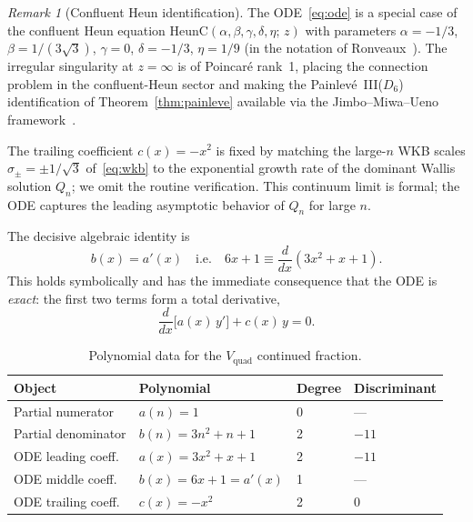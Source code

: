 \documentclass[11pt,a4paper]{article}
\theoremstyle{definition}
\theoremstyle{remark}
\newtheorem{remark}[theorem]{Remark}
\newcommand{\Vq}{V_{\mathrm{quad}}}
\begin{document}
\begin{remark}[Confluent Heun identification]
\label{rem:heunc}
The ODE~\eqref{eq:ode} is a special case of the confluent Heun
equation $\mathrm{HeunC}(\alpha,\beta,\gamma,\delta,\eta;\,z)$
with parameters $\alpha = -1/3$, $\beta = 1/(3\sqrt{3})$,
$\gamma = 0$, $\delta = -1/3$, $\eta = 1/9$
(in the notation of Ronveaux~\cite{ronveaux1995}).
The irregular singularity at $z=\infty$ is of Poincar\'e rank~1,
placing the connection problem in the confluent-Heun sector
and making the Painlev\'e~III($D_6$) identification of
Theorem~\ref{thm:painleve} available via the Jimbo--Miwa--Ueno
framework~\cite{jimbo1981}.
\end{remark}

The trailing coefficient $c(x)=-x^2$ is fixed by
matching the large-$n$ WKB scales
$\sigma_\pm = \pm 1/\sqrt{3}$ of~\eqref{eq:wkb}
to the exponential growth rate of the dominant Wallis
solution $Q_n$; we omit the routine verification.
This continuum limit is formal; the ODE captures the
leading asymptotic behavior of $Q_n$ for large $n$.

The decisive algebraic identity is
\begin{equation}\label{eq:exact-identity}
  b(x) = a'(x)
  \quad\text{i.e.}\quad
  6x+1 \equiv \frac{d}{dx}(3x^2+x+1).
\end{equation}
This holds symbolically and has the immediate
consequence that the ODE is \emph{exact}: the
first two terms form a total derivative,
\begin{equation}\label{eq:exact-ode}
  \frac{d}{dx}\bigl[a(x)\,y'\bigr]
  + c(x)\,y = 0.
\end{equation}

\begin{table}[ht]
\centering
\caption{Polynomial data for the
$\Vq$ continued fraction.}
\label{tab:poly}
\small
\begin{tabular}{@{}llll@{}}
\toprule
Object & Polynomial & Degree & Discriminant \\
\midrule
Partial numerator & $a(n) = 1$ & 0 & --- \\
Partial denominator & $b(n) = 3n^2+n+1$ & 2 & $-11$ \\
ODE leading coeff.\ & $a(x) = 3x^2+x+1$ & 2 & $-11$ \\
ODE middle coeff.\ & $b(x) = 6x+1 = a'(x)$ & 1 & --- \\
ODE trailing coeff.\ & $c(x) = -x^2$ & 2 & $0$ \\
\bottomrule
\end{tabular}
\end{table}
\end{document}
